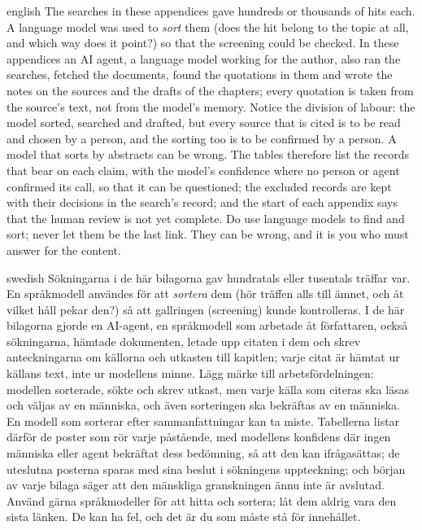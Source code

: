 \begin{onlyin}{english} %
The searches in these appendices gave hundreds or thousands of hits
each.  A language model was used to \emph{sort} them (does the hit
belong to the topic at all, and which way does it point?) so that the
screening could be checked.  In these appendices an AI agent, a language
model working for the author, also ran the searches, fetched the
documents, found the quotations in them and wrote the notes on the
sources and the drafts of the chapters; every quotation is taken from
the source's text, not from the model's memory.  Notice the division of
labour: the model sorted, searched and drafted, but every source that is
cited is to be read and chosen by a person, and the sorting too is to be
confirmed by a person.  A model that sorts by abstracts can be wrong.
The tables therefore list the records that bear on each claim, with the
model's confidence where no person or agent confirmed its call, so that
it can be questioned; the excluded records are kept with their decisions
in the search's record; and the start of each appendix says that the
human review is not yet complete.  Do use
language models to find and sort; never let them be the last link.  They
can be wrong, and it is you who must answer for the content.
\end{onlyin}
\begin{onlyin}{swedish}
Sökningarna i de här bilagorna gav hundratals eller tusentals träffar
var.  En språkmodell användes för att \emph{sortera} dem (hör träffen
alls till ämnet, och åt vilket håll pekar den?) så att gallringen
(\foreignlanguage{english}{screening}) kunde
kontrolleras.  I de här bilagorna gjorde en AI-agent, en språkmodell som
arbetade åt författaren, också sökningarna, hämtade dokumenten, letade
upp citaten i dem och skrev anteckningarna om källorna och utkasten till
kapitlen; varje citat är hämtat ur källans text, inte ur modellens
minne.  Lägg märke till arbetsfördelningen: modellen sorterade, sökte och
skrev utkast, men varje källa som citeras ska läsas och väljas av en
människa, och även sorteringen ska bekräftas av en människa.  En modell
som sorterar efter sammanfattningar kan ta miste.  Tabellerna listar
därför de poster som rör varje påstående, med
modellens konfidens där ingen människa eller agent bekräftat dess
bedömning, så att den kan ifrågasättas; de uteslutna posterna sparas med
sina beslut i sökningens uppteckning; och början av varje bilaga säger
att den mänskliga granskningen ännu inte är avslutad.  Använd gärna
språkmodeller för att hitta och sortera; låt dem aldrig vara den sista länken.
De kan ha fel,
och det är du som måste stå för innehållet.
\end{onlyin}

